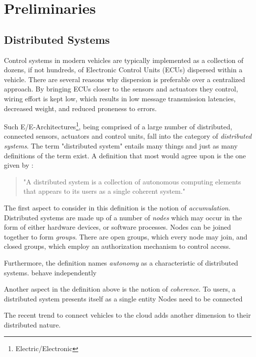 

\chapter{Preliminaries}\label{chapter:preliminaries}


\section{Distributed Systems}

Control systems in modern vehicles are typically implemented as a collection of dozens, if not hundreds, of Electronic Control Units (ECUs) dispersed within a vehicle. There are several reasons why dispersion is preferable over a centralized approach. By bringing ECUs closer to the sensors and actuators they control, wiring effort is kept low, which results in low message transmission latencies, decreased weight, and reduced proneness to errors. 

Such E/E-Architectures\footnote{Electric/Electronic}, being comprised of a large number of distributed, connected sensors, actuators and control units, fall into the category of \emph{distributed systems}. The term "distributed system" entails many things and just as many definitions of the term exist. A definition that most would agree upon is the one given by \citeauthor*{tanenbaum2017distributed} \cite{tanenbaum2017distributed}: 
\begin{quote}
"A distributed system is a collection of autonomous computing elements that appears to its users as a single coherent system."
\end{quote}

The first aspect to consider in this definition is the notion of \emph{accumulation}. Distributed systems are made up of a number of \emph{nodes} which may occur in the form of either hardware devices, or software processes. Nodes can be joined together to form \emph{groups}. There are open groups, which every node may join, and closed groups, which employ an authorization mechanism to control access. 

Furthermore, the definition names \emph{autonomy} as a characteristic of distributed systems.
behave independently

Another aspect in the definition above is the notion of \emph{coherence}.
To users, a distributed system presents itself as a single entity
Nodes need to be connected

The recent trend to connect vehicles to the cloud adds another dimension to their distributed nature.


